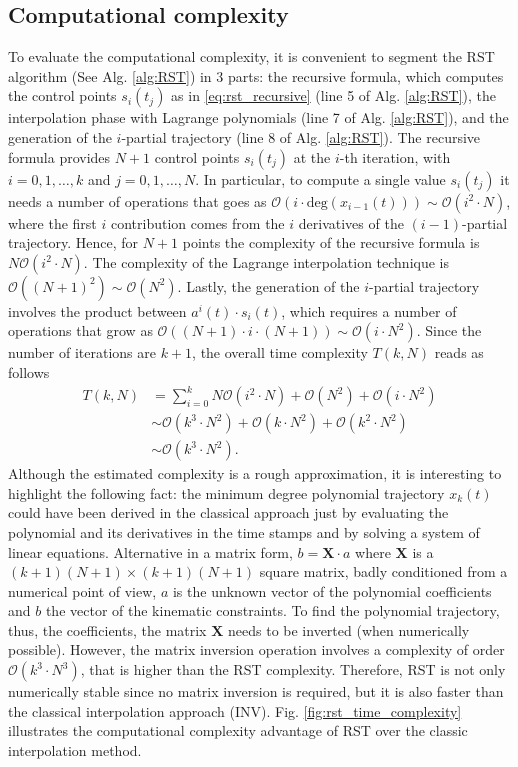\subsection{Computational complexity}
\label{subsec:rst_complexity}
To evaluate the computational complexity, it is convenient to segment the RST algorithm (See Alg. \ref{alg:RST}) in $3$ parts: the recursive formula, which computes the control points $s_i(t_j)$ as in \eqref{eq:rst_recursive} (line 5 of Alg. \ref{alg:RST}), the interpolation phase with Lagrange polynomials (line 7 of Alg. \ref{alg:RST}), and the generation of the $i$-partial trajectory (line 8 of Alg. \ref{alg:RST}).
The recursive formula provides $N+1$ control points $s_i(t_j)$ at the $i$-th iteration, with $i=0,1,\dots,k$ and $j=0,1,\dots,N$. In particular, to compute a single value $s_i(t_j)$ it needs a number of operations that goes as $\mathcal{O}(i\cdot \text{deg}(x_{i-1}(t))) \sim \mathcal{O}(i^2 \cdot N)$, where the first $i$ contribution comes from the $i$ derivatives of the $(i-1)$-partial trajectory. Hence, for $N+1$ points the complexity of the recursive formula is $N\mathcal{O}(i^2 \cdot N)$. The complexity of the Lagrange interpolation technique is $\mathcal{O}((N+1)^2) \sim \mathcal{O}(N^2)$. Lastly, the generation of the $i$-partial trajectory involves the product between $a^i(t)\cdot s_i(t)$, which requires a number of operations that grow as $\mathcal{O}((N+1)\cdot i \cdot (N+1)) \sim \mathcal{O}(i \cdot N^2)$. Since the number of iterations are $k+1$, the overall time complexity $T(k,N)$ reads as follows
\begin{align}
T(k,N) &= \sum_{i=0}^{k}{N\mathcal{O}(i^2 \cdot N)+\mathcal{O}(N^2)+\mathcal{O}(i \cdot N^2)} \nonumber \\
& \sim \mathcal{O}(k^3 \cdot N^2)+\mathcal{O}(k\cdot N^2)+\mathcal{O}(k^2 \cdot N^2) \nonumber \\
& \sim \mathcal{O}(k^3 \cdot N^2).
\end{align}
Although the estimated complexity is a rough approximation, it is interesting to highlight the following fact: the minimum degree polynomial trajectory $x_k(t)$ could have been derived in the classical approach just by evaluating the polynomial and its derivatives in the time stamps and by solving a system of linear equations. Alternative in a matrix form, $b = \mathbf{X}\cdot a$ where $\mathbf{X}$ is a $(k+1)(N+1)\times (k+1)(N+1)$ square matrix, badly conditioned from a numerical point of view, $a$ is the unknown vector of the polynomial coefficients and $b$ the vector of the kinematic constraints. To find the polynomial trajectory, thus, the coefficients, the matrix $\mathbf{X}$ needs to be inverted (when numerically possible). However, the matrix inversion operation involves a complexity of order $\mathcal{O}(k^3 \cdot N^3)$, that is higher than the RST complexity. Therefore, RST is not only numerically stable since no matrix inversion is required, but it is also faster than the classical interpolation approach (INV). Fig. \ref{fig:rst_time_complexity} illustrates the computational complexity advantage of RST over the classic interpolation method.

